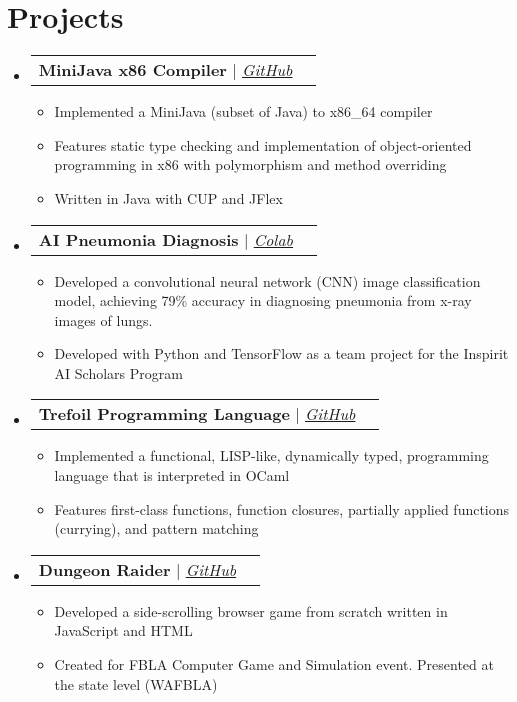 \documentclass[letterpaper,11pt]{article}
\makeatletter
\newcommand{\resumeItem}[1]{
  \item\small{
    {#1 \vspace{-2pt}}
  }
}
\newcommand{\resumeProjectHeading}[2]{
    \vspace{-2pt}\item
    \begin{tabular*}{0.97\textwidth}{l@{\extracolsep{\fill}}r}
      \small#1 & #2 \\
    \end{tabular*}\vspace{-7pt}
}
\newcommand{\resumeSubHeadingListStart}{\begin{itemize}[leftmargin=0.15in, label={}]}
\newcommand{\resumeSubHeadingListEnd}{\end{itemize}}
\newcommand{\resumeItemListStart}{\begin{itemize}}
\newcommand{\resumeItemListEnd}{\end{itemize}\vspace{-5pt}}
\makeatother
\begin{document}

\section{Projects}
    \vspace{3pt}
    \resumeSubHeadingListStart
      
      \resumeProjectHeading
        {\textbf{MiniJava x86 Compiler} $|$ \emph{\href{https://github.com/Vladimirtrif/MiniJava-x86-Compiler/tree/master}{\color{blue}GitHub}}}{}
          \resumeItemListStart
            \resumeItem{Implemented a MiniJava (subset of Java) to x86\_64 compiler}
            \resumeItem{Features static type checking and implementation of object-oriented programming in x86 with polymorphism and method overriding}
            \resumeItem{Written in Java with CUP and JFlex}
      \resumeItemListEnd

      \resumeProjectHeading
        {\textbf{AI Pneumonia Diagnosis} $|$ \emph{\href{https://drive.google.com/drive/folders/1L4dHkkq_Mn3XkGTIh0rnGlhvCqryG1bR?usp=sharing}{\color{blue}Colab}}}{}
          \resumeItemListStart
            \resumeItem{
              Developed a convolutional neural network (CNN) image classification model, achieving 79\% accuracy in diagnosing
              pneumonia from x-ray images of lungs.
            }
            \resumeItem{Developed with Python and TensorFlow as a team project for the Inspirit AI Scholars Program}
      \resumeItemListEnd
      
      \resumeProjectHeading
        {\textbf{Trefoil Programming Language} $|$ \emph{\href{https://github.com/Vladimirtrif/trefoil}{\color{blue}GitHub}}}{}
          \resumeItemListStart
            \resumeItem{Implemented a functional, LISP-like, dynamically typed, programming language that is interpreted in OCaml}
            \resumeItem{Features first-class functions, function closures, partially applied functions (currying), and pattern matching}
      \resumeItemListEnd

      \resumeProjectHeading
        {\textbf{Dungeon Raider} $|$ \emph{\href{https://github.com/Vladimirtrif/DungeonRaider}{\color{blue}GitHub}}}{}
          \resumeItemListStart
            \resumeItem{ Developed a side-scrolling browser game from scratch written in JavaScript and HTML}
            \resumeItem{ Created for FBLA Computer Game and Simulation event. Presented at the state level (WAFBLA)}
      \resumeItemListEnd

      
    \resumeSubHeadingListEnd
\end{document}
